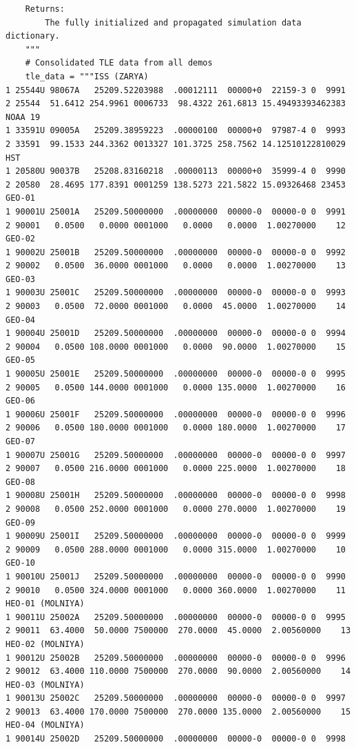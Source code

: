 \documentclass[11pt]{article}
\begin{document}
\begin{Verbatim}
    Returns:
        The fully initialized and propagated simulation data dictionary.
    """
    # Consolidated TLE data from all demos
    tle_data = """ISS (ZARYA)
1 25544U 98067A   25209.52203988  .00012111  00000+0  22159-3 0  9991
2 25544  51.6412 254.9961 0006733  98.4322 261.6813 15.49493393462383
NOAA 19
1 33591U 09005A   25209.38959223  .00000100  00000+0  97987-4 0  9993
2 33591  99.1533 244.3362 0013327 101.3725 258.7562 14.12510122810029
HST
1 20580U 90037B   25208.83160218  .00000113  00000+0  35999-4 0  9990
2 20580  28.4695 177.8391 0001259 138.5273 221.5822 15.09326468 23453
GEO-01
1 90001U 25001A   25209.50000000  .00000000  00000-0  00000-0 0  9991
2 90001   0.0500   0.0000 0001000   0.0000   0.0000  1.00270000    12
GEO-02
1 90002U 25001B   25209.50000000  .00000000  00000-0  00000-0 0  9992
2 90002   0.0500  36.0000 0001000   0.0000   0.0000  1.00270000    13
GEO-03
1 90003U 25001C   25209.50000000  .00000000  00000-0  00000-0 0  9993
2 90003   0.0500  72.0000 0001000   0.0000  45.0000  1.00270000    14
GEO-04
1 90004U 25001D   25209.50000000  .00000000  00000-0  00000-0 0  9994
2 90004   0.0500 108.0000 0001000   0.0000  90.0000  1.00270000    15
GEO-05
1 90005U 25001E   25209.50000000  .00000000  00000-0  00000-0 0  9995
2 90005   0.0500 144.0000 0001000   0.0000 135.0000  1.00270000    16
GEO-06
1 90006U 25001F   25209.50000000  .00000000  00000-0  00000-0 0  9996
2 90006   0.0500 180.0000 0001000   0.0000 180.0000  1.00270000    17
GEO-07
1 90007U 25001G   25209.50000000  .00000000  00000-0  00000-0 0  9997
2 90007   0.0500 216.0000 0001000   0.0000 225.0000  1.00270000    18
GEO-08
1 90008U 25001H   25209.50000000  .00000000  00000-0  00000-0 0  9998
2 90008   0.0500 252.0000 0001000   0.0000 270.0000  1.00270000    19
GEO-09
1 90009U 25001I   25209.50000000  .00000000  00000-0  00000-0 0  9999
2 90009   0.0500 288.0000 0001000   0.0000 315.0000  1.00270000    10
GEO-10
1 90010U 25001J   25209.50000000  .00000000  00000-0  00000-0 0  9990
2 90010   0.0500 324.0000 0001000   0.0000 360.0000  1.00270000    11
HEO-01 (MOLNIYA)
1 90011U 25002A   25209.50000000  .00000000  00000-0  00000-0 0  9995
2 90011  63.4000  50.0000 7500000  270.0000  45.0000  2.00560000    13
HEO-02 (MOLNIYA)
1 90012U 25002B   25209.50000000  .00000000  00000-0  00000-0 0  9996
2 90012  63.4000 110.0000 7500000  270.0000  90.0000  2.00560000    14
HEO-03 (MOLNIYA)
1 90013U 25002C   25209.50000000  .00000000  00000-0  00000-0 0  9997
2 90013  63.4000 170.0000 7500000  270.0000 135.0000  2.00560000    15
HEO-04 (MOLNIYA)
1 90014U 25002D   25209.50000000  .00000000  00000-0  00000-0 0  9998

\end{Verbatim}
\end{document}
